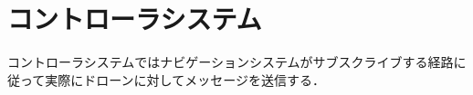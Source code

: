 \section{コントローラシステム}
\label{proposed_controller}
コントローラシステムではナビゲーションシステムがサブスクライブする経路に従って実際にドローンに対してメッセージを送信する．

